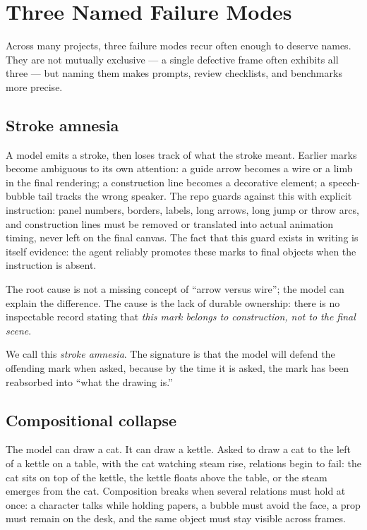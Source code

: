 \documentclass[10pt,twocolumn]{article}
\newcommand{\term}[1]{\textit{#1}}
\begin{document}
\section{Three Named Failure Modes}

Across many projects, three failure modes recur often enough to
deserve names. They are not mutually exclusive --- a single defective
frame often exhibits all three --- but naming them makes prompts,
review checklists, and benchmarks more precise.

\subsection{Stroke amnesia}

A model emits a stroke, then loses track of what the stroke meant.
Earlier marks become ambiguous to its own attention: a guide arrow
becomes a wire or a limb in the final rendering; a construction line
becomes a decorative element; a speech-bubble tail tracks the wrong
speaker. The repo guards against this with explicit instruction:
panel numbers, borders, labels, long arrows, long jump or throw arcs,
and construction lines must be removed or translated into actual
animation timing, never left on the final canvas. The fact that this
guard exists in writing is itself evidence: the agent reliably
promotes these marks to final objects when the instruction is absent.

The root cause is not a missing concept of ``arrow versus wire'';
the model can explain the difference. The cause is the lack of
durable ownership: there is no inspectable record stating that
\emph{this mark belongs to construction, not to the final scene}.

We call this \term{stroke amnesia}. The signature is that the model
will defend the offending mark when asked, because by the time it is
asked, the mark has been reabsorbed into ``what the drawing is.''

\subsection{Compositional collapse}

The model can draw a cat. It can draw a kettle. Asked to draw a cat
to the left of a kettle on a table, with the cat watching steam rise,
relations begin to fail: the cat sits on top of the kettle, the
kettle floats above the table, or the steam emerges from the cat.
Composition breaks when several relations must hold at once: a
character talks while holding papers, a bubble must avoid the face, a
prop must remain on the desk, and the same object must stay visible
across frames.
\end{document}
